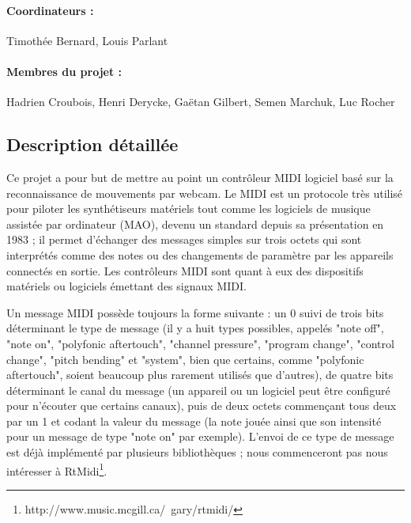 
\usepackage[svgnames]{xcolor}
\usepackage{pgfgantt}



\maketitle
\paragraph{Coordinateurs :} Timothée Bernard, Louis Parlant
\paragraph{Membres du projet :} Hadrien Croubois, Henri Derycke, Gaëtan Gilbert, Semen Marchuk, Luc Rocher

\subsection*{Description détaillée}
\par Ce projet a pour but de mettre au point un contrôleur MIDI logiciel basé sur la reconnaissance de mouvements par webcam. Le MIDI est un protocole très utilisé pour piloter les synthétiseurs matériels tout comme les logiciels de musique assistée par ordinateur (MAO), devenu un standard depuis sa présentation en 1983 ; il permet d'échanger des messages simples sur trois octets qui sont interprétés comme des notes ou des changements de paramètre par les appareils connectés en sortie. Les contrôleurs MIDI sont quant à eux des dispositifs matériels ou logiciels émettant des signaux MIDI.

\par Un message MIDI possède toujours la forme suivante : un 0 suivi de trois bits déterminant le type de message (il y a huit types possibles, appelés "note off", "note on", "polyfonic aftertouch", "channel pressure", "program change", "control change", "pitch bending" et "system", bien que certains, comme "polyfonic aftertouch", soient beaucoup plus rarement utilisés que d'autres), de quatre bits déterminant le canal du message (un appareil ou un logiciel peut être configuré pour n'écouter que certains canaux), puis de deux octets commençant tous deux par un 1 et codant la valeur du message (la note jouée ainsi que son intensité pour un message de type "note on" par exemple). L'envoi de ce type de message est déjà implémenté par plusieurs bibliothèques ; nous commenceront pas nous intéresser à RtMidi\footnote{http://www.music.mcgill.ca/~gary/rtmidi/}.

